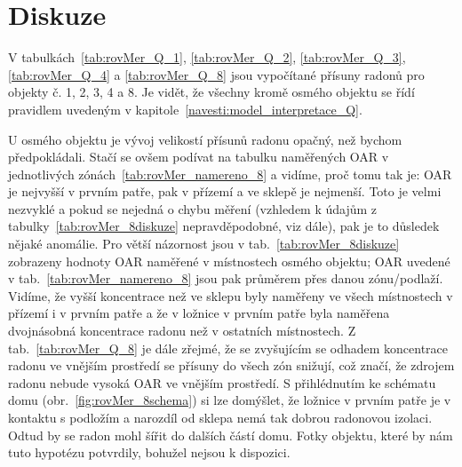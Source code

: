 \section{Diskuze}
V tabulkách~\ref{tab:rovMer_Q_1}, \ref{tab:rovMer_Q_2}, \ref{tab:rovMer_Q_3}, \ref{tab:rovMer_Q_4} a \ref{tab:rovMer_Q_8} jsou vypočítané přísuny radonů pro objekty č. 1, 2, 3, 4 a 8. Je vidět, že všechny kromě osmého objektu se řídí pravidlem uvedeným v kapitole~\ref{navesti:model_interpretace_Q}. 

U osmého objektu je vývoj velikostí přísunů radonu opačný, než bychom předpokládali. Stačí se ovšem podívat na tabulku naměřených OAR v jednotlivých zónách~\ref{tab:rovMer_namereno_8} a vidíme, proč tomu tak je: OAR je nejvyšší v prvním patře, pak v přízemí a ve sklepě je nejmenší. Toto je velmi nezvyklé a pokud se nejedná o chybu měření (vzhledem k údajům z tabulky~\ref{tab:rovMer_8diskuze} nepravděpodobné, viz dále), pak je to důsledek nějaké anomálie. Pro větší názornost jsou v tab.~\ref{tab:rovMer_8diskuze} zobrazeny hodnoty OAR naměřené v místnostech osmého objektu; OAR uvedené v tab.~\ref{tab:rovMer_namereno_8} jsou pak průměrem přes danou zónu/podlaží. Vidíme, že vyšší koncentrace než ve sklepu byly naměřeny ve všech místnostech v přízemí i v prvním patře a že v ložnice v prvním
patře byla naměřena dvojnásobná koncentrace radonu než v ostatních místnostech. Z tab.~\ref{tab:rovMer_Q_8} je dále zřejmé, že se zvyšujícím se odhadem koncentrace radonu ve vnějším prostředí se přísuny do všech zón snižují, což značí, že zdrojem radonu nebude vysoká OAR ve vnějším prostředí. S přihlédnutím ke schématu domu (obr.~\ref{fig:rovMer_8schema}) si lze domýšlet, že ložnice v prvním patře je v kontaktu s podložím a narozdíl od sklepa nemá tak dobrou radonovou izolaci. Odtud by se radon mohl šířit do dalších částí domu. Fotky objektu, které by nám tuto hypotézu potvrdily, bohužel nejsou k dispozici.

